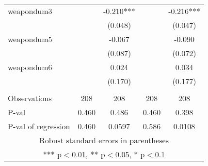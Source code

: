 \documentclass[]{article}
\begin{document}
\begin{tabular}{lcccc}
weapondum3 &  & -0.210*** &  & -0.216*** \\
 &  & (0.048) &  & (0.047) \\
weapondum5 &  & -0.067 &  & -0.090 \\
 &  & (0.087) &  & (0.072) \\
weapondum6 &  & 0.024 &  & 0.034 \\
 &  & (0.170) &  & (0.177) \\
 &  &  &  &  \\
Observations & 208 & 208 & 208 & 208 \\
P-val & 0.460 & 0.486 & 0.460 & 0.398 \\
 P-val of regression & 0.460 & 0.0597 & 0.586 & 0.0108 \\ \hline
\multicolumn{5}{c}{ Robust standard errors in parentheses} \\
\multicolumn{5}{c}{ *** p$<$0.01, ** p$<$0.05, * p$<$0.1} \\
\end{tabular}
\end{document}
